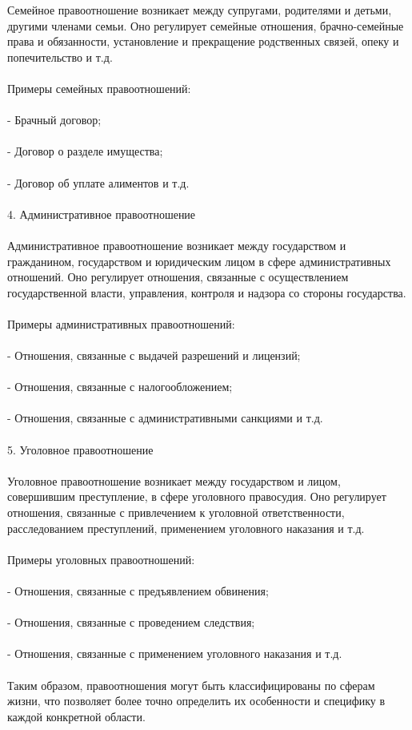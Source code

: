 \documentclass{article}
\begin{document}
Семейное правоотношение возникает между супругами, родителями и детьми, другими членами семьи. Оно регулирует семейные отношения, брачно-семейные права и обязанности, установление и прекращение родственных связей, опеку и попечительство и т.д.\\
~\\
Примеры семейных правоотношений:\\
~\\
- Брачный договор;\\
~\\
- Договор о разделе имущества;\\
~\\
- Договор об уплате алиментов и т.д.\\
~\\
4. Административное правоотношение\\
~\\
Административное правоотношение возникает между государством и гражданином, государством и юридическим лицом в сфере административных отношений. Оно регулирует отношения, связанные с осуществлением государственной власти, управления, контроля и надзора со стороны государства.\\
~\\
Примеры административных правоотношений:\\
~\\
- Отношения, связанные с выдачей разрешений и лицензий;\\
~\\
- Отношения, связанные с налогообложением;\\
~\\
- Отношения, связанные с административными санкциями и т.д.\\
~\\
5. Уголовное правоотношение\\
~\\
Уголовное правоотношение возникает между государством и лицом, совершившим преступление, в сфере уголовного правосудия. Оно регулирует отношения, связанные с привлечением к уголовной ответственности, расследованием преступлений, применением уголовного наказания и т.д.\\
~\\
Примеры уголовных правоотношений:\\
~\\
- Отношения, связанные с предъявлением обвинения;\\
~\\
- Отношения, связанные с проведением следствия;\\
~\\
- Отношения, связанные с применением уголовного наказания и т.д.\\
~\\
Таким образом, правоотношения могут быть классифицированы по сферам жизни, что позволяет более точно определить их особенности и специфику в каждой конкретной области.
\end{document}
